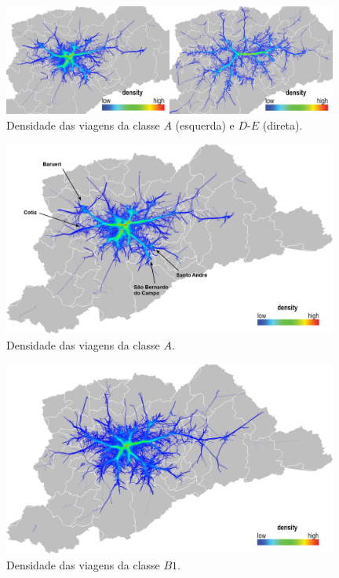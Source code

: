 \begin{figure}[!htb]
  \centering
  \captionsetup{justification=centering}
  \includegraphics[width=0.98\textwidth]{../figuras/comparison-axd-e-strata-leg.png}
  \caption{Densidade das viagens da classe $A$ (esquerda) e $D$-$E$ (direta). \label{fig:becc-axd-e}}
\end{figure}

\begin{figure}[!htb]
  \centering
  \captionsetup{justification=centering}
  \includegraphics[width=0.98\textwidth]{../figuras/1-class-a.png}
  \caption{Densidade das viagens da classe $A$. \label{fig:becc-a}}
\end{figure}

\begin{figure}[!htb]
  \centering
  \captionsetup{justification=centering}
  \includegraphics[width=0.98\textwidth]{../figuras/2-class-b1.png}
  \caption{Densidade das viagens da classe $B1$. \label{fig:becc-b1}}
\end{figure}

